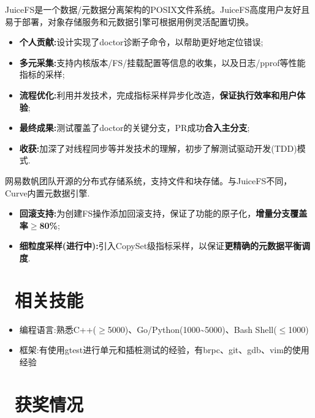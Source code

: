 \documentclass{resume}
\begin{document}
JuiceFS是一个数据/元数据分离架构的POSIX文件系统。JuiceFS高度用户友好且易于部署，对象存储服务和元数据引擎可根据用例灵活配置切换。
\begin{itemize}[parsep=0.3ex]
  \item \textbf{个人贡献:}设计实现了doctor诊断子命令，以帮助更好地定位错误;
  \item \textbf{多元采集:}支持内核版本/FS/挂载配置等信息的收集，以及日志/pprof等性能指标的采样;
  \item \textbf{流程优化:}利用并发技术，完成指标采样异步化改造，\textbf{保证执行效率和用户体验};
  \item \textbf{最终成果:}测试覆盖了doctor的关键分支，PR成功\textbf{合入主分支};\enspace{}
  \item \textbf{收获:}加深了对线程同步等并发技术的理解，初步了解测试驱动开发(TDD)模式.
\end{itemize}
网易数帆团队开源的分布式存储系统，支持文件和块存储。与JuiceFS不同，Curve内置元数据引擎.
\begin{itemize}[parsep=0.3ex]
  \item \textbf{回滚支持:}为创建FS操作添加回滚支持，保证了功能的原子化，\textbf{增量分支覆盖率$\geq$80\%};
  \item \textbf{细粒度采样(进行中):}引入CopySet级指标采样，以保证\textbf{更精确的元数据平衡调度}.
\end{itemize}
\section{\faCogs\ 相关技能}
\begin{itemize}[parsep=0.5ex]
  \item 编程语言:熟悉C++($\geq${5000})、Go/Python(1000\textasciitilde5000)、Bash Shell($\leq$1000)
  \item 框架:有使用gtest进行单元和插桩测试的经验，有brpc、git、gdb、vim的使用经验
\end{itemize}
\section{\faHeartO\ 获奖情况}
\end{document}
